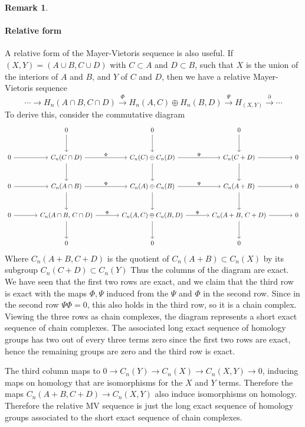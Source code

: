 \documentclass[11pt,a4paper]{article}
\theoremstyle{definition}
\newtheorem{remark}[definition]{Remark}
\theoremstyle{plain}
\theoremstyle{remark}
\begin{document}
\begin{remark}
\paragraph{Relative form} 
A relative form of the Mayer-Vietoris sequence is also useful. If $(X, Y) = (A \cup B, C \cup D)$ with $C \subset A$ and $D \subset B$, 
such that $X$ is the union of the interiors of $A$ and $B$, and $Y$ of $C$ and $D$, then we have a relative Mayer-Vietoris sequence 
$$\cdots \to H_n(A \cap B, C \cap D) \xrightarrow{\Phi} H_n (A, C) \oplus H_n (B, D) \xrightarrow{\Psi} H_(X, Y) \xrightarrow{\partial} \cdots $$
To derive this, consider the commutative diagram 
\[
\begin{tikzcd}[column sep=large,row sep=large]
& 0 \arrow[d] & 0 \arrow[d] & 0 \arrow[d] & \\
0 \arrow[r] &
C_n(C\cap D) \arrow[r, "{\Phi}"] \arrow[d] &
C_n(C)\oplus C_n(D) \arrow[r, "{\Psi}"] \arrow[d] &
C_n(C+D) \arrow[r] \arrow[d] &
0 \\
0 \arrow[r] &
C_n(A\cap B) \arrow[r, "{\Phi}"] \arrow[d] &
C_n(A)\oplus C_n(B) \arrow[r, "{\Psi}"] \arrow[d] &
C_n(A+B) \arrow[r] \arrow[d] &
0 \\
0 \arrow[r] &
C_n(A\cap B,\,C\cap D) \arrow[r, "{\Phi}"] \arrow[d] &
C_n(A,C)\oplus C_n(B,D) \arrow[r, "{\Psi}"] \arrow[d] &
C_n(A+B,\,C+D) \arrow[r] \arrow[d] &
0 \\
& 0 & 0 & 0 &
\end{tikzcd}
\]
Where $C_n(A + B, C + D)$ is the quotient of $C_n (A + B) \subset C_n (X)$ by its subgroup 
$C_n (C + D) \subset C_n (Y)$ Thus the columns of the diagram are exact. We have seen that the 
first two rows are exact, and we claim that the third row is exact with the maps $\Phi, \Psi$ induced 
from the $\Psi$ and $\Phi$ in the second row. Since in the second row $\Psi \Phi = 0$, this also holds in the third 
row, so it is a chain complex. Viewing the three rows as chain complexes, the diagram represents a short exact sequence of 
chain complexes. The associated long exact sequence of homology groups has two out of every three terms zero 
since the first two rows are exact, hence the remaining groups are zero and the third row is exact. 

The third column maps to $0 \to C_n (Y) \to C_n(X) \to C_n(X, Y) \to 0$, inducing maps on homology that are isomorphisms for the $X$ and $Y$ terms. 
Therefore the maps $C_n(A+B, C+D) \to C_n (X,Y)$ also induce isomorphisms on homology. Therefore the relative MV sequence is just the long 
exact sequence of homology groups associated to the short exact sequence of chain complexes.  


\end{remark}
\end{document}

